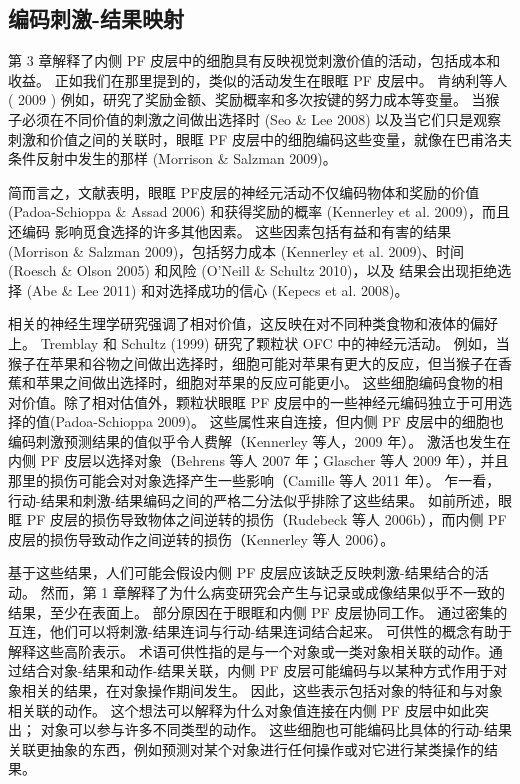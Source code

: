 \subsection{编码刺激-结果映射}
第 3 章解释了内侧 PF 皮层中的细胞具有反映视觉刺激价值的活动，包括成本和收益。 正如我们在那里提到的，类似的活动发生在眼眶 PF 皮层中。 肯纳利等人( 2009 ) 例如，研究了奖励金额、奖励概率和多次按键的努力成本等变量。 当猴子必须在不同价值的刺激之间做出选择时 (Seo \& Lee 2008) 以及当它们只是观察刺激和价值之间的关联时，眼眶 PF 皮层中的细胞编码这些变量，就像在巴甫洛夫条件反射中发生的那样 (Morrison \& Salzman 2009)。\par
简而言之，文献表明，眼眶 PF皮层的神经元活动不仅编码物体和奖励的价值 (Padoa-Schioppa \& Assad 2006) 和获得奖励的概率 (Kennerley et al. 2009)，而且还编码 影响觅食选择的许多其他因素。 这些因素包括有益和有害的结果 (Morrison \& Salzman 2009)，包括努力成本 (Kennerley et al. 2009)、时间 (Roesch \& Olson 2005) 和风险 (O'Neill \& Schultz 2010)，以及 结果会出现拒绝选择 (Abe \& Lee 2011) 和对选择成功的信心 (Kepecs et al. 2008)。\par
相关的神经生理学研究强调了相对价值，这反映在对不同种类食物和液体的偏好上。 Tremblay 和 Schultz (1999) 研究了颗粒状 OFC 中的神经元活动。 例如，当猴子在苹果和谷物之间做出选择时，细胞可能对苹果有更大的反应，但当猴子在香蕉和苹果之间做出选择时，细胞对苹果的反应可能更小。 这些细胞编码食物的相对价值。除了相对估值外，颗粒状眼眶 PF 皮层中的一些神经元编码独立于可用选择的值(Padoa-Schioppa 2009)。
这些属性来自连接，但内侧 PF 皮层中的细胞也编码刺激预测结果的值似乎令人费解（Kennerley 等人，2009 年）。 激活也发生在内侧 PF 皮层以选择对象（Behrens 等人 2007 年；Glascher 等人 2009 年），并且那里的损伤可能会对对象选择产生一些影响（Camille 等人 2011 年）。 乍一看，行动-结果和刺激-结果编码之间的严格二分法似乎排除了这些结果。 如前所述，眼眶 PF 皮层的损伤导致物体之间逆转的损伤（Rudebeck 等人 2006b），而内侧 PF 皮层的损伤导致动作之间逆转的损伤（Kennerley 等人 2006）。\par
基于这些结果，人们可能会假设内侧 PF 皮层应该缺乏反映刺激-结果结合的活动。 然而，第 1 章解释了为什么病变研究会产生与记录或成像结果似乎不一致的结果，至少在表面上。 部分原因在于眼眶和内侧 PF 皮层协同工作。 通过密集的互连，他们可以将刺激-结果连词与行动-结果连词结合起来。
可供性的概念有助于解释这些高阶表示。 术语可供性指的是与一个对象或一类对象相关联的动作。通过结合对象-结果和动作-结果关联，内侧 PF 皮层可能编码与以某种方式作用于对象相关的结果，在对象操作期间发生。 因此，这些表示包括对象的特征和与对象相关联的动作。 这个想法可以解释为什么对象值连接在内侧 PF 皮层中如此突出； 对象可以参与许多不同类型的动作。 这些细胞也可能编码比具体的行动-结果关联更抽象的东西，例如预测对某个对象进行任何操作或对它进行某类操作的结果。\par

